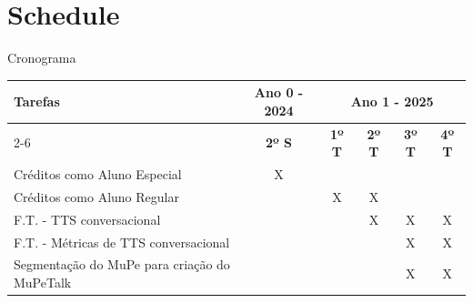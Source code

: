 \section{Schedule}

\begin{frame}{Cronograma}
  \tiny
  \begin{table}[]
    \begin{tabular}{|l|c|cccc|}
      \hline
      \multirow{2}{*}{\textbf{Tarefas}}
      & \multicolumn{1}{c|}{\textbf{Ano 0 - 2024}}           &
      \multicolumn{4}{c|}{\textbf{Ano 1 - 2025}}
      \\ \cline{2-6}
      & \multicolumn{1}{c|}{\textbf{2º S}}                   &
      \multicolumn{1}{c|}{\textbf{1º T}} & \multicolumn{1}{c|}{\textbf{2º T}} &
      \multicolumn{1}{c|}{\textbf{3º T}} & \textbf{4º T} \\ \hline
      Créditos como Aluno Especial
      & \multicolumn{1}{c|}{X}                               & \multicolumn{1}{c|}{}
      & \multicolumn{1}{c|}{}              & \multicolumn{1}{c|}{}              &
      \\ \hline
      Créditos como Aluno Regular
      & \multicolumn{1}{c|}{}                                & \multicolumn{1}{c|}{X}
      & \multicolumn{1}{c|}{X}             & \multicolumn{1}{c|}{}              &
      \\ \hline
      F.T. - TTS conversacional
      & \multicolumn{1}{c|}{}                                & \multicolumn{1}{c|}{}
      & \multicolumn{1}{c|}{X}             & \multicolumn{1}{c|}{X}             & X
      \\ \hline
      F.T. - Métricas de TTS conversacional
      & \multicolumn{1}{c|}{}                                & \multicolumn{1}{c|}{}
      & \multicolumn{1}{c|}{}              & \multicolumn{1}{c|}{X}             & X
      \\ \hline
      Segmentação do MuPe para criação do MuPeTalk
      & \multicolumn{1}{c|}{}                                & \multicolumn{1}{c|}{}
      & \multicolumn{1}{c|}{}              & \multicolumn{1}{c|}{X}             & X
      \\ \hline
    \end{tabular}
  \end{table}
\end{frame}

